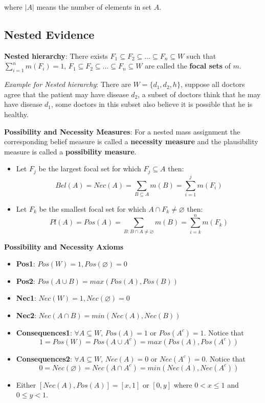 \documentclass{article}
\begin{document}
where $|A|$ means the number of elements in set $A$.


\subsection{Nested Evidence}

\textbf{Nested hierarchy}: There exists $F_1 \subseteq F_2 \subseteq \dots \subseteq F_n \subseteq W$ such that $\sum^n_{i=1}m(F_i)=1$, $F_1 \subseteq F_2 \subseteq \dots \subseteq F_n \subseteq W$ are called the \textbf{focal sets} of $m$.

\textit{Example for Nested hierarchy}: There are $W=\{d_1, d_2, h\}$, suppose all doctors agree that the patient may have disease $d_2$, a subset of doctors think that he may have disease $d_1$, some doctors in this subset also believe it is possible that he is healthy.

\textbf{Possibility and Necessity Measures}: For a nested mass assignment the corresponding belief measure is called a \textbf{necessity measure} and the plausibility measure is called a \textbf{possibility measure}.

\begin{itemize}
    \item Let $F_j$ be the largest focal set for which $F_j \subseteq A$ then:
    \begin{equation}
        Bel(A) = Nec(A) = \sum_{B \subseteq A}m(B) = \sum^{j}_{i=1}m(F_i)
    \end{equation}
    \item Let $F_k$ be the smallest focal set for which $A \cap F_k \neq \varnothing$ then:
    \begin{equation}
        Pl(A) = Pos(A) = \sum_{B:B \cap A \neq \varnothing}m(B) = \sum^{n}_{i=k}m(F_k)
    \end{equation}
\end{itemize}

\textbf{Possibility and Necessity Axioms}

\begin{itemize}
    \item \textbf{Pos1}: $Pos(W) = 1, Pos(\varnothing)=0$
    \item \textbf{Pos2}: $Pos(A \cup B) = max(Pos(A), Pos(B))$
    \item \textbf{Nec1}: $Nec(W) = 1, Nec(\varnothing)=0$
    \item \textbf{Nec2}: $Nec(A \cap B) = min(Nec(A), Nec(B))$
    \item \textbf{Consequences1}: $\forall A \subseteq W$, $Pos(A) = 1$ or $ Pos(A^c) = 1$. Notice that $$1 = Pos(W) = Pos(A \cup A^c) = max(Pos(A), Pos(A^c))$$
    \item \textbf{Consequences2}: $\forall A \subseteq W$, $Nec(A) = 0$ or $Nec(A^c) = 0$. Notice that $$0 = Nec(\varnothing) = Nec(A \cap A^c) = min(Nec(A), Nec(A^c))$$
    \item Either $[Nec(A), Pos(A)] = [x, 1]$ or $[0, y]$ where $0 < x \leq 1$ and $0 \leq y < 1$.
\end{itemize}
\end{document}
